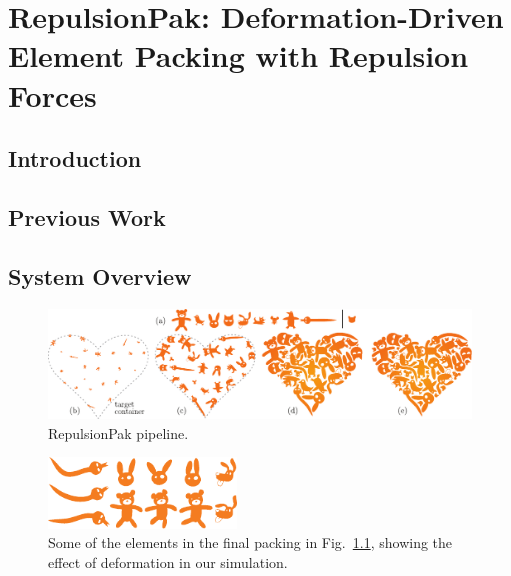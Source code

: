\chapter{RepulsionPak: Deformation-Driven Element Packing with Repulsion Forces}

\section{Introduction}


\section{Previous Work}

\section{System Overview}

\begin{figure}[h]
\centering
\includegraphics[width=1.0\textwidth]{figures/repulsionpak/pipeline.pdf} 
\caption{\label{fig_repulsionpak_pipeline} 
RepulsionPak pipeline. }
\end{figure}

\begin{figure}[h]
\centering
\includegraphics[width=5cm]{figures/repulsionpak/pipeline_defviz_csk.pdf}
\caption{
	\label{fig_defviz}
	Some of the elements in the final packing in Fig.~\ref{fig_repulsionpak_pipeline}, 
	showing the effect of deformation in our simulation.
}
\end{figure}


